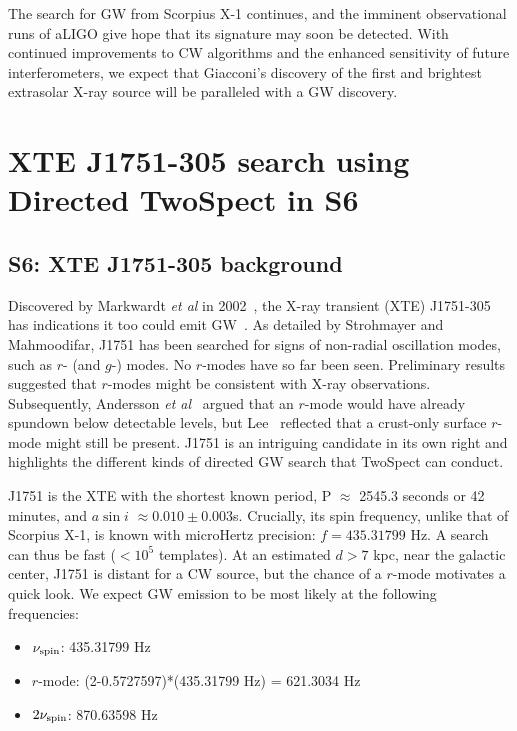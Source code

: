 The search for GW from Scorpius X-1 continues, and the imminent observational runs of aLIGO give hope that its signature may soon be detected.
With continued improvements to CW algorithms and the enhanced sensitivity of future interferometers, we expect that Giacconi's discovery of the first and brightest extrasolar X-ray source will be paralleled with a GW discovery.

\section{XTE J1751-305 search using Directed TwoSpect in S6}

\subsection{S6: XTE J1751-305 background}

Discovered by Markwardt \textit{et al} in 2002~\cite{Markwardt2002}, the X-ray transient (XTE) J1751-305 has indications it too could emit GW~\cite{Strohmayer2014}.
As detailed by Strohmayer and Mahmoodifar, J1751 has been searched for signs of non-radial oscillation modes, such as $r$- (and $g$-) modes.
No $r$-modes have so far been seen.
Preliminary results suggested that $r$-modes might be consistent with X-ray observations.
Subsequently, Andersson \textit{et al}~\cite{Andersson2014} argued that an $r$-mode would have already spundown below detectable levels, but Lee~\cite{Lee2014} reflected that a crust-only surface $r$-mode might still be present. 
 J1751 is an intriguing candidate in its own right and highlights the different kinds of directed GW search that TwoSpect can conduct.

J1751 is the XTE with the shortest known period,
P $\approx$$ $ 2545.3 seconds or 42 minutes, and $a \sin i$ $\approx0.010\pm0.003$s.
Crucially, its spin frequency, unlike that of Scorpius X-1, is known with microHertz precision: $f = 435.31799$ Hz.
A search can thus be fast ($< 10^5$ templates).
At an estimated $d > 7$ kpc, near the galactic center, J1751 is distant for a CW source, but the chance of a $r$-mode motivates a quick look.
We expect GW emission to be most likely at the following frequencies:

\begin{itemize}
\item $\nu_\textup{spin}$: 435.31799 Hz
\item $r$-mode: (2-0.5727597)*(435.31799 Hz) = 621.3034 Hz
\item $2\nu_\textup{spin}$: 870.63598 Hz
\end{itemize}

